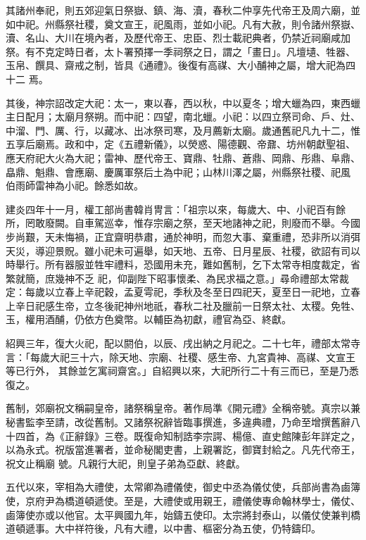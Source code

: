 \begin{pinyinscope}
 其諸州奉祀，則五郊迎氣日祭嶽、鎮、海、瀆，春秋二仲享先代帝王及周六廟，並如中祀。州縣祭社稷，奠文宣王，祀風雨，並如小祀。凡有大赦，則令諸州祭嶽、瀆、名山、大川在境內者，及歷代帝王、忠臣、烈士載祀典者，仍禁近祠廟咸加祭。有不克定時日者，太卜署預擇一季祠祭之日，謂之「畫日」。凡壇壝、牲器、玉帛、饌具、齋戒之制，皆具《通禮》。後復有高禖、大小酺神之屬，增大祀為四十二
 焉。



 其後，神宗詔改定大祀：太一，東以春，西以秋，中以夏冬；增大蠟為四，東西蠟主日配月；太廟月祭朔。而中祀：四望，南北蠟。小祀：以四立祭司命、戶、灶、中溜、門、厲、行，以藏冰、出冰祭司寒，及月薦新太廟。歲通舊祀凡九十二，惟五享后廟焉。政和中，定《五禮新儀》，以熒惑、陽德觀、帝鼐、坊州朝獻聖祖、應天府祀大火為大祀；雷神、歷代帝王、寶鼎、牡鼎、蒼鼎、岡鼎、彤鼎、阜鼎、皛鼎、魁鼎、會應廟、慶厲軍祭后土為中祀；山林川澤之屬，州縣祭社稷、祀風
 伯雨師雷神為小祀。餘悉如故。



 建炎四年十一月，權工部尚書韓肖冑言：「祖宗以來，每歲大、中、小祀百有餘所，罔敢廢闕。自車駕巡幸，惟存宗廟之祭，至天地諸神之祀，則廢而不舉。今國步尚艱，天未悔禍，正宜齋明恭肅，通於神明，而忽大事、棄重禮，恐非所以消弭天災，導迎景貺。雖小祀未可遍舉，如天地、五帝、日月星辰、社稷，欲詔有司以時舉行。所有器服並牲牢禮料，恐國用未充，難如舊制，乞下太常寺相度裁定，省繁就簡，庶幾神不乏
 祀，仰副陛下昭事懷柔、為民求福之意。」尋命禮部太常裁定：每歲以立春上辛祀穀，孟夏雩祀，季秋及冬至日四祀天，夏至日一祀地，立春上辛日祀感生帝，立冬後祀神州地祇，春秋二社及臘前一日祭太社、太稷。免牲、玉，權用酒酺，仍依方色奠幣。以輔臣為初獻，禮官為亞、終獻。



 紹興三年，復大火祀，配以閼伯，以辰、戌出納之月祀之。二十七年，禮部太常寺言：「每歲大祀三十六，除天地、宗廟、社稷、感生帝、九宮貴神、高禖、文宣王等已行外，
 其餘並乞寓祠齋宮。」自紹興以來，大祀所行二十有三而已，至是乃悉復之。



 舊制，郊廟祝文稱嗣皇帝，諸祭稱皇帝。著作局準《開元禮》全稱帝號。真宗以兼秘書監李至請，改從舊制。又諸祭祝辭皆臨事撰進，多違典禮，乃命至增撰舊辭八十四首，為《正辭錄》三卷。既復命知制誥李宗諤、楊億、直史館陳彭年詳定之，以為永式。祝版當進署者，並命秘閣吏書，上親署訖，御寶封給之。凡先代帝王，祝文止稱廟
 號。凡親行大祀，則皇子弟為亞獻、終獻。



 五代以來，宰相為大禮使，太常卿為禮儀使，御史中丞為儀仗使，兵部尚書為鹵簿使，京府尹為橋道頓遞使。至是，大禮使或用親王，禮儀使專命翰林學士，儀仗、鹵簿使亦或以他官。太平興國九年，始鑄五使印。太宗將封泰山，以儀仗使兼判橋道頓遞事。大中祥符後，凡有大禮，以中書、樞密分為五使，仍特鑄印。




\end{pinyinscope}
